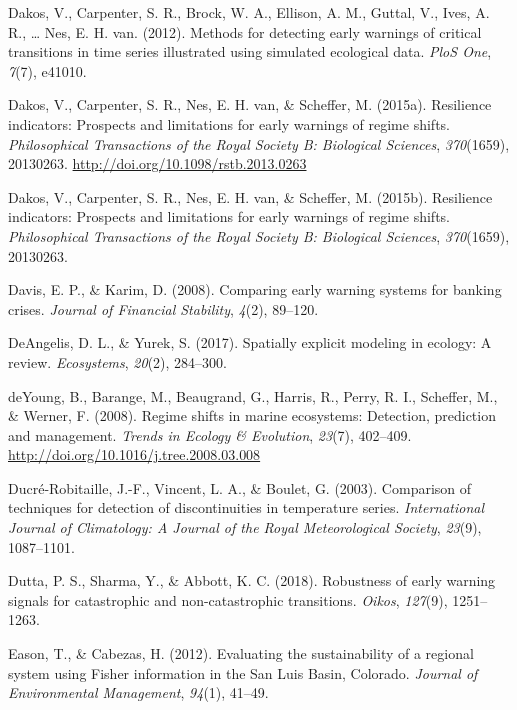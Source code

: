 \documentclass[12pt,twoside,openany]{reedthesis}
\begin{document}
\hypertarget{ref-dakos_methods_2012}{}
Dakos, V., Carpenter, S. R., Brock, W. A., Ellison, A. M., Guttal, V.,
Ives, A. R., \ldots{} Nes, E. H. van. (2012). Methods for detecting
early warnings of critical transitions in time series illustrated using
simulated ecological data. \emph{PloS One}, \emph{7}(7), e41010.

\hypertarget{ref-dakos_resilience_2015}{}
Dakos, V., Carpenter, S. R., Nes, E. H. van, \& Scheffer, M. (2015a).
Resilience indicators: Prospects and limitations for early warnings of
regime shifts. \emph{Philosophical Transactions of the Royal Society B:
Biological Sciences}, \emph{370}(1659), 20130263.
\url{http://doi.org/10.1098/rstb.2013.0263}

\hypertarget{ref-dakos2015resilience}{}
Dakos, V., Carpenter, S. R., Nes, E. H. van, \& Scheffer, M. (2015b).
Resilience indicators: Prospects and limitations for early warnings of
regime shifts. \emph{Philosophical Transactions of the Royal Society B:
Biological Sciences}, \emph{370}(1659), 20130263.

\hypertarget{ref-davis_comparing_2008}{}
Davis, E. P., \& Karim, D. (2008). Comparing early warning systems for
banking crises. \emph{Journal of Financial Stability}, \emph{4}(2),
89--120.

\hypertarget{ref-deangelis2017spatially}{}
DeAngelis, D. L., \& Yurek, S. (2017). Spatially explicit modeling in
ecology: A review. \emph{Ecosystems}, \emph{20}(2), 284--300.

\hypertarget{ref-deyoung_regime_2008}{}
deYoung, B., Barange, M., Beaugrand, G., Harris, R., Perry, R. I.,
Scheffer, M., \& Werner, F. (2008). Regime shifts in marine ecosystems:
Detection, prediction and management. \emph{Trends in Ecology \&
Evolution}, \emph{23}(7), 402--409.
\url{http://doi.org/10.1016/j.tree.2008.03.008}

\hypertarget{ref-ducre2003comparison}{}
Ducré-Robitaille, J.-F., Vincent, L. A., \& Boulet, G. (2003).
Comparison of techniques for detection of discontinuities in temperature
series. \emph{International Journal of Climatology: A Journal of the
Royal Meteorological Society}, \emph{23}(9), 1087--1101.

\hypertarget{ref-dutta2018robustness}{}
Dutta, P. S., Sharma, Y., \& Abbott, K. C. (2018). Robustness of early
warning signals for catastrophic and non-catastrophic transitions.
\emph{Oikos}, \emph{127}(9), 1251--1263.

\hypertarget{ref-eason_evaluating_2012}{}
Eason, T., \& Cabezas, H. (2012). Evaluating the sustainability of a
regional system using Fisher information in the San Luis Basin,
Colorado. \emph{Journal of Environmental Management}, \emph{94}(1),
41--49.
\end{document}
